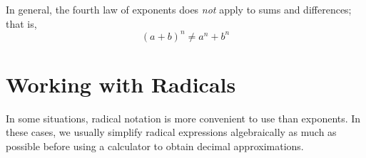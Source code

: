 \documentclass[10pt,]{book}
\theoremstyle{plain}
\theoremstyle{definition}
\theoremstyle{definition}
\theoremstyle{definition}
\numberwithin{equation}{part}
\begin{document}
\par
In general, the fourth law of exponents does \emph{not} apply to sums and differences; that is,%
\begin{equation*}
(a+b)^n\ne a^n + b^n 
\end{equation*}
%
\typeout{************************************************}
\typeout{************************************************}
\section[{Working with Radicals}]{Working with Radicals}\label{appendix-Working-with-Radicals}
In some situations, radical notation is more convenient to use than exponents. In these cases, we usually simplify radical expressions algebraically as much as possible before using a calculator to obtain decimal approximations.%
\typeout{************************************************}
\typeout{************************************************}
\end{document}
